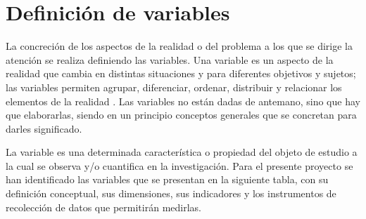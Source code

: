 
\section{Definici\'on de variables}

La concreci\'on de los aspectos de la realidad o del problema a los que se
dirige la atenci\'on se realiza definiendo las variables. Una variable es un
aspecto de la realidad que cambia en distintas situaciones y para diferentes
objetivos y sujetos; las variables permiten agrupar, diferenciar, ordenar,
distribuir y relacionar los elementos de la realidad \citep{hernandez2014}.
Las variables no est\'an dadas de antemano, sino que hay que elaborarlas,
siendo en un principio conceptos generales que se concretan para darles
significado.

La variable es una determinada caracter\'istica o propiedad del objeto de
estudio a la cual se observa y/o cuantifica en la investigaci\'on. Para el
presente proyecto se han identificado las variables que se presentan en la
siguiente tabla, con su definici\'on conceptual, sus dimensiones, sus
indicadores y los instrumentos de recolecci\'on de datos que permitir\'an
medirlas.

